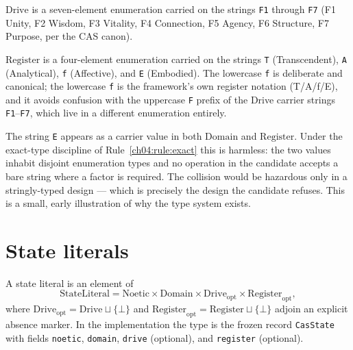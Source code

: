 \begin{definition}\label{ch04:def:drive}
$\mathrm{Drive}$ is a seven-element enumeration carried on the strings
\texttt{F1} through \texttt{F7} (F1 Unity, F2 Wisdom, F3 Vitality,
F4 Connection, F5 Agency, F6 Structure, F7 Purpose, per the CAS canon).
\end{definition}

\begin{definition}\label{ch04:def:register}
$\mathrm{Register}$ is a four-element enumeration carried on the strings
\texttt{T} (Transcendent), \texttt{A} (Analytical), \texttt{f} (Affective),
and \texttt{E} (Embodied). The lowercase \texttt{f} is deliberate and
canonical; the lowercase \texttt{f} is the framework's own register
notation (T/A/f/E), and it avoids confusion with the uppercase \texttt{F}
prefix of the Drive carrier strings \texttt{F1}--\texttt{F7}, which live
in a different enumeration entirely.
\end{definition}

\begin{remark}
The string \texttt{E} appears as a carrier value in both
$\mathrm{Domain}$ and $\mathrm{Register}$. Under the exact-type discipline
of Rule~\ref{ch04:rule:exact} this is harmless: the two values inhabit
disjoint enumeration types and no operation in the candidate accepts a bare
string where a factor is required. The collision would be hazardous only in
a stringly-typed design --- which is precisely the design the candidate
refuses. This is a small, early illustration of why the type system exists.
\end{remark}

\section{State literals}\label{ch04:sec:literals}

\begin{definition}\label{ch04:def:stateliteral}
A state literal is an element of
\[
\mathrm{StateLiteral}
 = \mathrm{Noetic} \times \mathrm{Domain}
 \times \mathrm{Drive}_{\mathrm{opt}} \times \mathrm{Register}_{\mathrm{opt}},
\]
where $\mathrm{Drive}_{\mathrm{opt}} = \mathrm{Drive} \sqcup \{\bot\}$ and
$\mathrm{Register}_{\mathrm{opt}} = \mathrm{Register} \sqcup \{\bot\}$
adjoin an explicit absence marker. In the implementation the type is the
frozen record \texttt{CasState} with fields \texttt{noetic},
\texttt{domain}, \texttt{drive} (optional), and \texttt{register}
(optional).
\end{definition}

